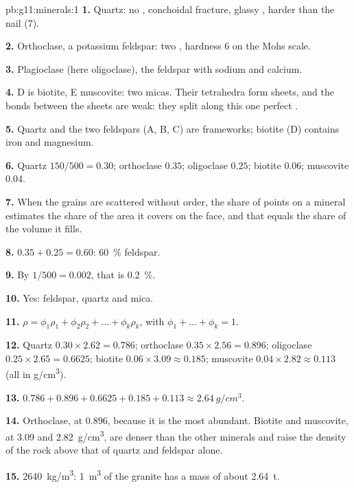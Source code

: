 \begin{solution}{pb:g11:minerals:1}
\textbf{1.} Quartz: no , conchoidal fracture, glassy , harder
than the nail (7).

\textbf{2.} Orthoclase, a potassium feldspar: two , hardness 6 on
the Mohs scale.

\textbf{3.} Plagioclase (here oligoclase), the feldspar with sodium and
calcium.

\textbf{4.} D is biotite, E muscovite: two micas. Their tetrahedra form
sheets, and the bonds between the sheets are weak: they split along this one
perfect .

\textbf{5.} Quartz and the two feldspars (A, B, C) are frameworks; biotite
(D) contains iron and magnesium.

\textbf{6.} Quartz $150/500 = 0.30$; orthoclase $0.35$; oligoclase $0.25$;
biotite $0.06$; muscovite $0.04$.

\textbf{7.} When the grains are scattered without order, the share of points
on a mineral estimates the share of the area it covers on the face, and that
equals the share of the volume it fills.

\textbf{8.} $0.35 + 0.25 = 0.60$: \qty{60}{\percent} feldspar.

\textbf{9.} By $1/500 = 0.002$, that is \qty{0.2}{\percent}.

\textbf{10.} Yes: feldspar, quartz and mica.

\textbf{11.} $\rho = \phi_1 \rho_1 + \phi_2 \rho_2 + \dots + \phi_k \rho_k$,
with $\phi_1 + \dots + \phi_k = 1$.

\textbf{12.} Quartz $0.30 \times 2.62 = 0.786$; orthoclase $0.35 \times 2.56 =
0.896$; oligoclase $0.25 \times 2.65 = 0.6625$; biotite $0.06 \times 3.09
\approx 0.185$; muscovite $0.04 \times 2.82 \approx 0.113$ (all in
\unit{g/cm^3}).

\textbf{13.} $0.786 + 0.896 + 0.6625 + 0.185 + 0.113 \approx
\qty{2.64}{g/cm^3}$.

\textbf{14.} Orthoclase, at $0.896$, because it is the most abundant. Biotite
and muscovite, at \qty{3.09}{} and \qty{2.82}{g/cm^3}, are denser than the
other minerals and raise the density of the rock above that of quartz and
feldspar alone.

\textbf{15.} \qty{2640}{kg/m^3}: \qty{1}{m^3} of the granite has a mass of
about \qty{2.64}{t}.


\end{solution}
